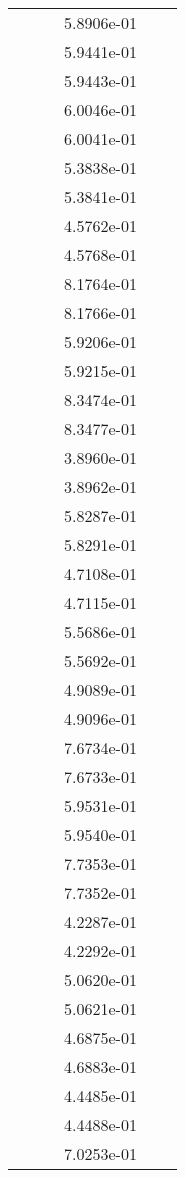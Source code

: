 \begin{xltabular}{\textwidth}{r|rS[table-format=1.3e+2]S[table-format=1.4e+2]S[table-format=1.4e+2]S[table-format=-1.5]}
&  &  & 5.8906e-01 & & \\
&  &  & 5.9441e-01 & & \\
&  &  & 5.9443e-01 & & \\
&  &  & 6.0046e-01 & & \\
&  &  & 6.0041e-01 & & \\
&  &  & 5.3838e-01 & & \\
&  &  & 5.3841e-01 & & \\
&  &  & 4.5762e-01 & & \\
&  &  & 4.5768e-01 & & \\
&  &  & 8.1764e-01 & & \\
&  &  & 8.1766e-01 & & \\
&  &  & 5.9206e-01 & & \\
&  &  & 5.9215e-01 & & \\
&  &  & 8.3474e-01 & & \\
&  &  & 8.3477e-01 & & \\
&  &  & 3.8960e-01 & & \\
&  &  & 3.8962e-01 & & \\
&  &  & 5.8287e-01 & & \\
&  &  & 5.8291e-01 & & \\
&  &  & 4.7108e-01 & & \\
&  &  & 4.7115e-01 & & \\
&  &  & 5.5686e-01 & & \\
&  &  & 5.5692e-01 & & \\
&  &  & 4.9089e-01 & & \\
&  &  & 4.9096e-01 & & \\
&  &  & 7.6734e-01 & & \\
&  &  & 7.6733e-01 & & \\
&  &  & 5.9531e-01 & & \\
&  &  & 5.9540e-01 & & \\
&  &  & 7.7353e-01 & & \\
&  &  & 7.7352e-01 & & \\
&  &  & 4.2287e-01 & & \\
&  &  & 4.2292e-01 & & \\
&  &  & 5.0620e-01 & & \\
&  &  & 5.0621e-01 & & \\
&  &  & 4.6875e-01 & & \\
&  &  & 4.6883e-01 & & \\
&  &  & 4.4485e-01 & & \\
&  &  & 4.4488e-01 & & \\
&  &  & 7.0253e-01 & & \\

\end{xltabular}
